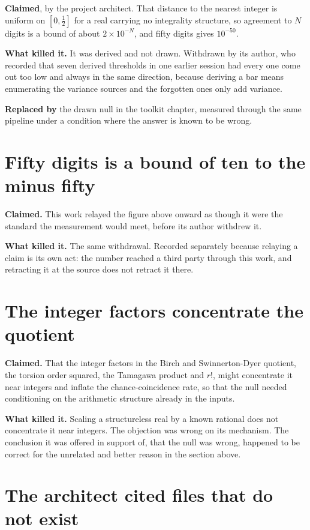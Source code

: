 \textbf{Claimed}, by the project architect. That distance to the nearest integer is uniform on
$[0,\tfrac12]$ for a real carrying no integrality structure, so agreement to $N$ digits is a bound
of about $2\times10^{-N}$, and fifty digits gives $10^{-50}$.

\textbf{What killed it.} It was derived and not drawn. Withdrawn by its author, who recorded
that seven derived thresholds in one earlier session had every one come out too low and always in
the same direction, because deriving a bar means enumerating the variance sources and the forgotten
ones only add variance.

\textbf{Replaced by} the drawn null in the toolkit chapter, measured through the same pipeline under
a condition where the answer is known to be wrong.

\section{Fifty digits is a bound of ten to the minus fifty}

\textbf{Claimed.} This work relayed the figure above onward as though it were the standard the
measurement would meet, before its author withdrew it.

\textbf{What killed it.} The same withdrawal. Recorded separately because relaying a claim is its
own act: the number reached a third party through this work, and retracting it at the source does
not retract it there.

\section{The integer factors concentrate the quotient}

\textbf{Claimed.} That the integer factors in the Birch and Swinnerton-Dyer quotient, the torsion
order squared, the Tamagawa product and $r!$, might concentrate it near integers and inflate the
chance-coincidence rate, so that the null needed conditioning on the arithmetic structure already
in the inputs.

\textbf{What killed it.} Scaling a structureless real by a known rational does not concentrate it
near integers. The objection was wrong on its mechanism. The conclusion it was offered in support
of, that the null was wrong, happened to be correct for the unrelated and better reason in the
section above.

\section{The architect cited files that do not exist}

